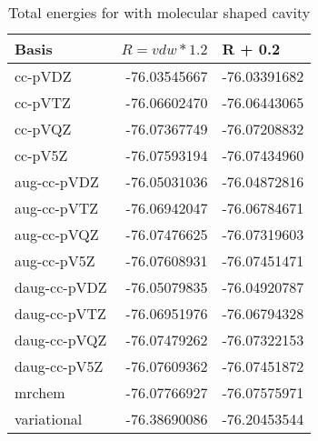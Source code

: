 \documentclass[../master_thesis.tex]{subfiles}
\begin{document}
\begin{table}[htbp]
\caption{Total energies for  with molecular shaped cavity}
\begin{tabular}{l|r|r}
Basis & \multicolumn{1}{l|}{$R = vdw*1.2$} & \multicolumn{1}{l|}{R + 0.2} \\ \hline
cc-pVDZ & -76.03545667 & -76.03391682 \\ \hline
cc-pVTZ & -76.06602470 & -76.06443065 \\
cc-pVQZ & -76.07367749 & -76.07208832 \\
cc-pV5Z & -76.07593194 & -76.07434960 \\ \hline
aug-cc-pVDZ & -76.05031036 & -76.04872816 \\
aug-cc-pVTZ & -76.06942047 & -76.06784671 \\
aug-cc-pVQZ & -76.07476625 & -76.07319603 \\
aug-cc-pV5Z & -76.07608931 & -76.07451471 \\ \hline
daug-cc-pVDZ & -76.05079835 & -76.04920787 \\
daug-cc-pVTZ & -76.06951976 & -76.06794328 \\
daug-cc-pVQZ & -76.07479262 & -76.07322153 \\
daug-cc-pV5Z & -76.07609362 & -76.07451872 \\ \hline
mrchem & -76.07766927 & -76.07575971 \\
variational & -76.38690086 & -76.20453544 \\
\end{tabular}
\label{tab:watrawdataabc}
\end{table}
\end{document}
